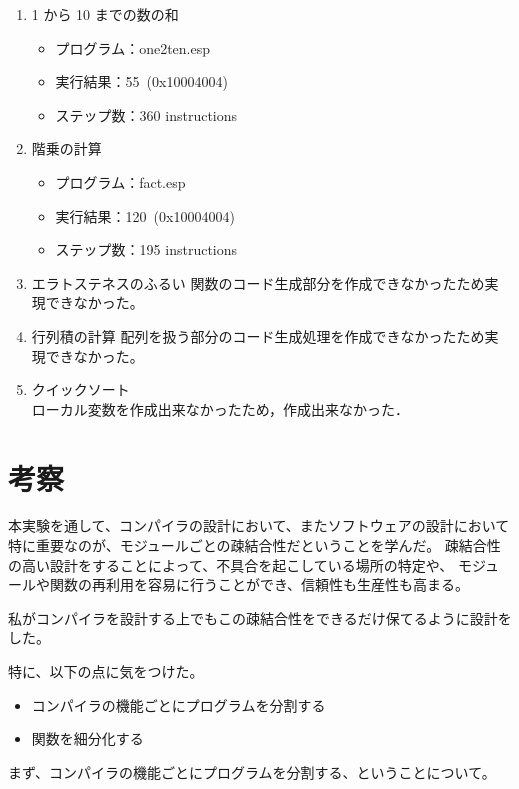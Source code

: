 \documentclass[11pt,a4j]{jarticle}
\begin{document}
\begin{enumerate}
\item {1 から 10 までの数の和 }
  \begin{itemize}
  \item
    プログラム：one2ten.esp
  \item
    実行結果：55~(0x10004004)
  \item
    ステップ数：360 instructions 
  \end{itemize}
\item {階乗の計算}
  \begin{itemize}
  \item
    プログラム：fact.esp
  \item
    実行結果：120~(0x10004004) %
  \item
    ステップ数：195 instructions %
  \end{itemize}
\item {エラトステネスのふるい}
  関数のコード生成部分を作成できなかったため実現できなかった。
\item {行列積の計算}
  配列を扱う部分のコード生成処理を作成できなかったため実現できなかった。
\item {クイックソート}\\
  ローカル変数を作成出来なかったため，作成出来なかった．
\end{enumerate}



\section{考察}

本実験を通して、コンパイラの設計において、またソフトウェアの設計において
特に重要なのが、モジュールごとの疎結合性だということを学んだ。
疎結合性の高い設計をすることによって、不具合を起こしている場所の特定や、
モジュールや関数の再利用を容易に行うことができ、信頼性も生産性も高まる。

私がコンパイラを設計する上でもこの疎結合性をできるだけ保てるように設計をした。

特に、以下の点に気をつけた。

\begin{itemize}
    \item コンパイラの機能ごとにプログラムを分割する
    \item 関数を細分化する
\end{itemize}


まず、コンパイラの機能ごとにプログラムを分割する、ということについて。
\end{document}

